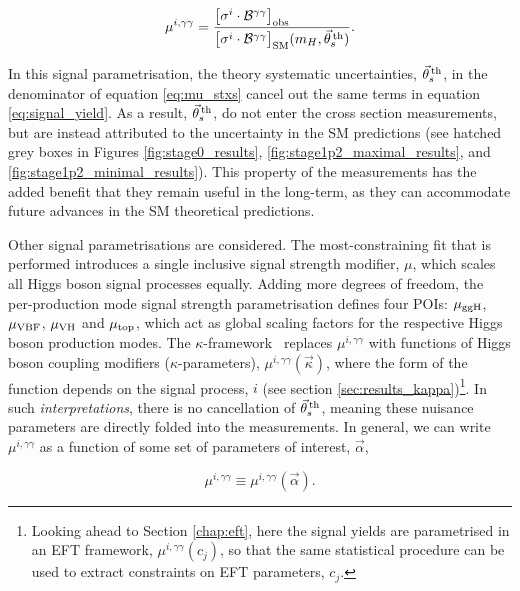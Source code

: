 \begin{equation}\label{eq:mu_stxs}
    \mu^{i,\gamma\gamma} = \frac{\big[\sigma^i \cdot \mathcal{B}^{\gamma\gamma} \big]_{\rm{obs}}\hfill}{\big[\sigma^i \cdot \mathcal{B}^{\gamma\gamma} \big]_{\rm{SM}}(m_H,\vec{\theta}^{\,\rm{th}}_{s})}.
\end{equation}

\noindent
In this signal parametrisation, the theory systematic uncertainties, $\vec{\theta}^{\,\rm{th}}_{s}$, in the denominator of equation \ref{eq:mu_stxs} cancel out the same terms in equation \ref{eq:signal_yield}. As a result, $\vec{\theta}^{\,\rm{th}}_{s}$, do not enter the cross section measurements, but are instead attributed to the uncertainty in the SM predictions (see hatched grey boxes in Figures \ref{fig:stage0_results}, \ref{fig:stage1p2_maximal_results}, and \ref{fig:stage1p2_minimal_results}). This property of the measurements has the added benefit that they remain useful in the long-term, as they can accommodate future advances in the SM theoretical predictions.

Other signal parametrisations are considered. The most-constraining fit that is performed introduces a single inclusive signal strength modifier, $\mu$, which scales all Higgs boson signal processes equally. Adding more degrees of freedom, the per-production mode signal strength parametrisation defines four POIs: $\mu_{\rm{ggH}}$, $\mu_{\rm{VBF}}$, $\mu_{\rm{VH}}$ and $\mu_{\rm{top}}$, which act as global scaling factors for the respective Higgs boson production modes. The $\kappa$-framework~\cite{Heinemeyer:2013tqa} replaces $\mu^{i,\gamma\gamma}$ with functions of Higgs boson coupling modifiers ($\kappa$-parameters), $\mu^{i,\gamma\gamma}(\vec{\kappa})$, where the form of the function depends on the signal process, $i$ (see section \ref{sec:results_kappa})\footnote{Looking ahead to Section \ref{chap:eft}, here the signal yields are parametrised in an EFT framework, $\mu^{i,\gamma\gamma}(c_j)$, so that the same statistical procedure can be used to extract constraints on EFT parameters, $c_j$.}. In such \textit{interpretations}, there is no cancellation of $\vec{\theta}^{\,\rm{th}}_{s}$, meaning these nuisance parameters are directly folded into the measurements. In general, we can write $\mu^{i,\gamma\gamma}$ as a function of some set of parameters of interest, $\vec{\alpha}$,

\begin{equation}
    \mu^{i,\gamma\gamma} \equiv \mu^{i,\gamma\gamma}(\vec{\alpha}).
\end{equation}

